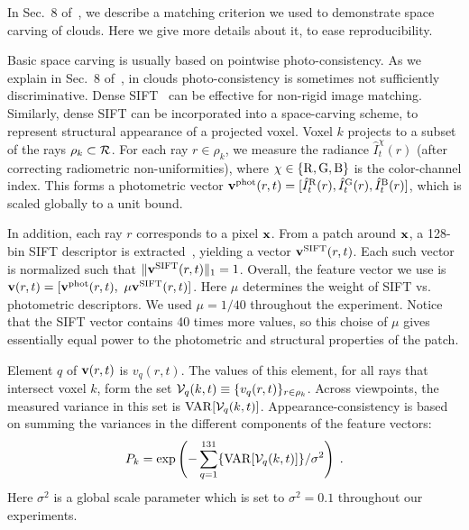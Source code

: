 \documentclass[runningheads]{llncs}
\begin{document}
In Sec.~8 of~\cite{danny2014}, we describe a matching criterion we used to demonstrate space carving of clouds. Here we give more details about it, to ease reproducibility.

Basic space carving is usually based on pointwise photo-consistency. As we explain in Sec.~8 of~\cite{danny2014}, in clouds photo-consistency is sometimes not sufficiently discriminative. Dense SIFT~\cite{liu2008sift} can be effective for non-rigid image matching. Similarly, dense SIFT can be incorporated into a space-carving scheme, to represent structural appearance of a projected voxel.
Voxel $k$ projects to a subset of the rays $\rho_k\subset{\cal R}$.
For each ray $r\in\rho_k$, we measure the radiance $\hat I_t^{\chi}(r)$ (after correcting radiometric non-uniformities), where
 $\chi\in\{{\rm R,G,B}\}$ is the color-channel index. This forms a photometric vector ${\bf v}^{\rm phot}(r,t)=[\hat I^{\rm R}_t(r),\hat I^{\rm G}_t(r),\hat I^{\rm B}_t(r)]$, which is scaled globally to a unit bound.

In addition, each ray $r$ corresponds to a pixel ${\bf x}$. From a %
patch around ${\bf x}$, a 128-bin SIFT descriptor is extracted~\cite{lowe1999object}, yielding a vector
${\bf v}^{\rm SIFT}(r,t)$. Each such vector is normalized such that
$\|{\bf v}^{\rm SIFT}(r,t)\|_1=1$. Overall, the feature vector we use is
${\bf v}(r,t)=[{\bf v}^{\rm phot}(r,t), ~\mu{\bf v}^{\rm SIFT}(r,t)]$. Here $\mu$ determines the weight of SIFT vs. photometric descriptors. We used $\mu=1/40$ throughout the experiment. Notice that the SIFT vector contains 40 times more values, so this choise of $\mu$ gives essentially equal power to the photometric and structural properties of the patch.

Element $q$ of ${\bf v}(r,t)$ is $v_q(r,t)$. The values of this element, for all rays that intersect voxel $k$, form the set \mbox{${\cal V}_q(k,t)\equiv\{v_q(r,t)\}_{r\in\rho_k}$}.
Across viewpoints, the measured variance in this set is
${\rm VAR}[{\cal V}_q(k,t)]$.
Appearance-consistency is based on summing the variances in the different components of the feature vectors:
\begin{equation}
 P_k= \exp\left(
         -\sum_{q=1}^{131}\{{\rm VAR}[{\cal V}_q(k,t)]\}/\sigma^2
         \right)
  \;.
 \label{eq:Dist}
\end{equation}
Here $\sigma^2$ is a global scale parameter which is set to $\sigma^2=0.1$ throughout our experiments.

 

\end{document}
